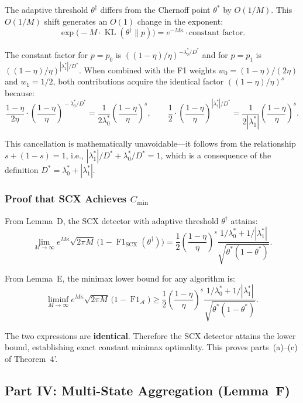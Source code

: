 The adaptive threshold $\theta^\dagger$ differs from the Chernoff point
$\theta^*$ by $O(1/M)$.  This $O(1/M)$ shift generates an $O(1)$ change in
the exponent:
\[
\exp\!\bigl(-M\cdot\operatorname{KL}(\theta^\dagger\|p)\bigr)
= e^{-M\kappa} \cdot \text{constant factor}.
\]

The constant factor for $p=p_0$ is $((1-\eta)/\eta)^{-\lambda_0^*/D^*}$
and for $p=p_1$ is $((1-\eta)/\eta)^{|\lambda_1^*|/D^*}$.  When combined
with the F1 weights $w_0=(1-\eta)/(2\eta)$ and $w_1=1/2$, both contributions
acquire the identical factor $((1-\eta)/\eta)^s$ because:
\[
\frac{1-\eta}{2\eta}
\cdot \left(\frac{1-\eta}{\eta}\right)^{\!-\lambda_0^*/D^*}
= \frac1{2\lambda_0^*}
  \left(\frac{1-\eta}{\eta}\right)^{\!s},
\qquad
\frac12
\cdot \left(\frac{1-\eta}{\eta}\right)^{\!|\lambda_1^*|/D^*}
= \frac1{2|\lambda_1^*|}
  \left(\frac{1-\eta}{\eta}\right)^{\!s}.
\]

This cancellation is mathematically unavoidable---it follows from the
relationship $s+(1-s)=1$, i.e.,
$|\lambda_1^*|/D^* + \lambda_0^*/D^* = 1$, which is a consequence of the
definition $D^*=\lambda_0^*+|\lambda_1^*|$.

\subsubsection{Proof that SCX Achieves $C_{\min}$}

From Lemma~D, the SCX detector with adaptive threshold $\theta^\dagger$
attains:
\[
\lim_{M\to\infty}
  e^{M\kappa}\sqrt{2\pi M}\,
  \bigl(1-\operatorname{F1}_{\text{SCX}}(\theta^\dagger)\bigr)
= \frac12\left(\frac{1-\eta}{\eta}\right)^{\!s}
  \frac{1/\lambda_0^* + 1/|\lambda_1^*|}
       {\sqrt{\theta^*(1-\theta^*)}}.
\]

From Lemma~E, the minimax lower bound for any algorithm is:
\[
\liminf_{M\to\infty}
  e^{M\kappa}\sqrt{2\pi M}\,
  \bigl(1-\operatorname{F1}_{\mathcal{A}}\bigr)
\ge \frac12\left(\frac{1-\eta}{\eta}\right)^{\!s}
    \frac{1/\lambda_0^* + 1/|\lambda_1^*|}
         {\sqrt{\theta^*(1-\theta^*)}}.
\]

The two expressions are \textbf{identical}.  Therefore the SCX detector
attains the lower bound, establishing exact constant minimax optimality.
This proves parts~(a)--(c) of Theorem~4'.

\subsection{Part IV: Multi-State Aggregation (Lemma~F)}
\label{sec:lemmaF}

